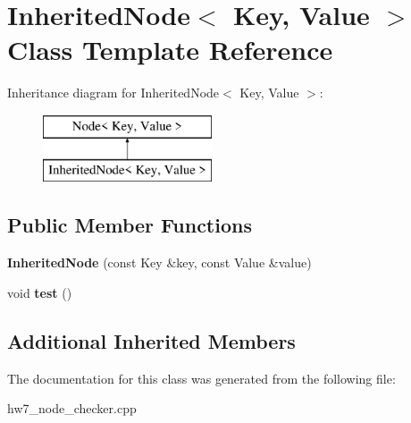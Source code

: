 \hypertarget{classInheritedNode}{}\section{Inherited\+Node$<$ Key, Value $>$ Class Template Reference}
\label{classInheritedNode}
Inheritance diagram for Inherited\+Node$<$ Key, Value $>$\+:\begin{figure}[H]
\begin{center}
\leavevmode
\includegraphics[height=2.000000cm]{classInheritedNode}
\end{center}
\end{figure}
\subsection*{Public Member Functions}
\begin{DoxyCompactItemize}
\item 
\mbox{\label{classInheritedNode_aaebcd7037935df516a404688cf1a625a}} 
{\bfseries Inherited\+Node} (const Key \&key, const Value \&value)
\item 
\mbox{\label{classInheritedNode_a33addaefed4aae2c4b2731e57d1fcd1c}} 
void {\bfseries test} ()
\end{DoxyCompactItemize}
\subsection*{Additional Inherited Members}


The documentation for this class was generated from the following file\+:\begin{DoxyCompactItemize}
\item 
hw7\+\_\+node\+\_\+checker.\+cpp\end{DoxyCompactItemize}
